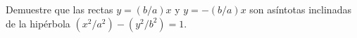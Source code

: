 \item Demuestre que las rectas $y = (b/a)x$ y $y = -(b/a)x$ son asíntotas inclinadas de la hipérbola $(x^2/a^2) - (y^2/b^2) = 1$.
